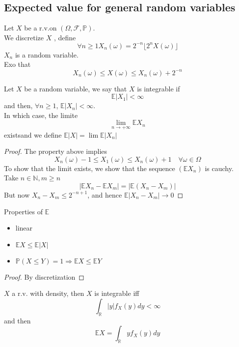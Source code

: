 \documentclass[../main.tex]{subfiles}
\begin{document}
\subsection{Expected value for general random variables}
Let $X$ be a r.v.on $( \Omega, \mathcal{F}, \mathbb{P}) $.\\
We discretize $X$ , define
\[ 
\forall n \geq 1 X_n( \omega) = 2^{-n}\lfloor 2^{n} X( \omega) \rfloor	
\]
$X_n$ is a random variable.\\
Exo that
\[ 
X_n( \omega) \leq X( \omega) \leq X_n( \omega) +2^{-n}
\]
\begin{propo}
Let $X$ be a random variable, we say that $X$ is integrable if
\[ 
\mathbb{E} |X_1|< \infty 
\]
and then, $\forall n \geq 1$, $ \mathbb{E}|X_n| < \infty $.\\
In which case, the limite
\[ 
\lim_{n \to  + \infty} \mathbb{E}X_n
\]
existsand we define $ \mathbb{E}|X| = \lim \mathbb{E}|X_n|$ 
\end{propo}
\begin{proof}
The property above implies
\[ 
X_n( \omega) -1 \leq X_1( \omega) \leq X_n( \omega) +1 \quad \forall \omega \in \Omega
\]
To show that the limit exists, we show that the sequence $ ( \mathbb{E} X_n) $ is cauchy.\\
Take $n \in \mathbb{N}, m \geq n$ 
\[ 
|\mathbb{E}X_n- \mathbb{E}X_m| = | \mathbb{E} ( X_n-X_m) |	
\]
But now $X_n -X_m \leq 2^{-n+1}$, and hence $ \mathbb{E} |X_n-X_m| \to 0$ 	
\end{proof}
\begin{propo}
Properties of $ \mathbb{E}$ 
\begin{itemize}
\item linear
\item $ \mathbb{E} X \leq  \mathbb{E}|X|$ 
\item $ \mathbb{P}( X \leq Y) =1 \Rightarrow \mathbb{E}X \leq \mathbb{E}Y$ 
\end{itemize}
\begin{proof}
By discretization
\end{proof}

\end{propo}
\begin{propo}
$X$ a r.v. with density, then $X$ is integrable iff
\[ 
\int_{ \mathbb{R} }^{  } |y| f_X( y) dy < \infty 
\]
and then
\[ 
\mathbb{E}X= \int_{ \mathbb{R} }^{  }y f_X( y) dy
\]


\end{propo}
\end{document}
